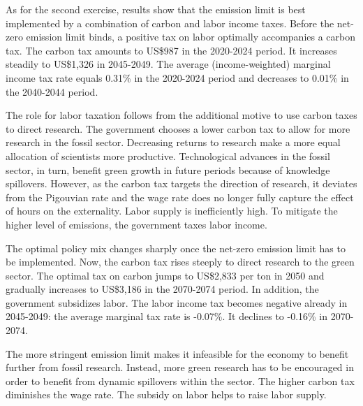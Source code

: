 As for the second exercise, results show that the emission limit is best implemented by a combination of carbon and labor income taxes. Before the net-zero emission limit binds, a positive tax on labor optimally accompanies a carbon tax. The carbon tax amounts to US\$987 in the 2020-2024 period. It increases steadily to US\$1,326 in 2045-2049. The average (income-weighted) marginal income tax rate equals 0.31\% in the 2020-2024 period and decreases to 0.01\% in the 2040-2044 period.

The role for labor taxation follows from the additional motive to use carbon taxes to direct research. The government chooses a lower carbon tax to allow for more research in the fossil sector. Decreasing returns to research make a more equal allocation of scientists more productive. Technological advances in the fossil sector, in turn, benefit green growth in future periods because of knowledge spillovers. However, as the carbon tax targets the direction of research, it deviates from the Pigouvian rate and the wage rate does no longer fully capture the effect of hours on the externality. Labor supply is inefficiently high.
To mitigate the higher level of emissions, the government taxes labor income. 

The optimal policy mix changes sharply once the net-zero emission limit has to be implemented. Now, the carbon tax rises steeply to direct research to the green sector. The optimal tax on carbon jumps to US\$2,833 per ton in 2050 and gradually increases to US\$3,186 in the 2070-2074 period. In addition, the government subsidizes labor. The labor income tax becomes negative already in 2045-2049: the average marginal tax rate is -0.07\%. It declines to -0.16\% in 2070-2074.

 The more stringent emission limit makes it infeasible for the economy to benefit further from fossil research. Instead, more green research has to be encouraged in order to benefit from dynamic spillovers within the sector. The higher carbon tax diminishes the wage rate. The subsidy on labor helps to raise labor supply.


